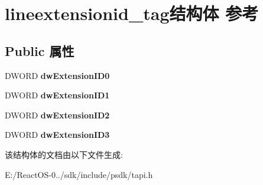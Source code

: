 \hypertarget{structlineextensionid__tag}{}\section{lineextensionid\+\_\+tag结构体 参考}
\label{structlineextensionid__tag}
\subsection*{Public 属性}
\begin{DoxyCompactItemize}
\item 
\mbox{\label{structlineextensionid__tag_a4101965402e7ad22344cae0bae2b930d}} 
D\+W\+O\+RD {\bfseries dw\+Extension\+I\+D0}
\item 
\mbox{\label{structlineextensionid__tag_abeabe2e620da84f50bebbb261ed52724}} 
D\+W\+O\+RD {\bfseries dw\+Extension\+I\+D1}
\item 
\mbox{\label{structlineextensionid__tag_aa7a6bb1ba00a1d0395dea706acea0fd5}} 
D\+W\+O\+RD {\bfseries dw\+Extension\+I\+D2}
\item 
\mbox{\label{structlineextensionid__tag_acc9229f77848ca591dca96f4acca04a0}} 
D\+W\+O\+RD {\bfseries dw\+Extension\+I\+D3}
\end{DoxyCompactItemize}


该结构体的文档由以下文件生成\+:\begin{DoxyCompactItemize}
\item 
E\+:/\+React\+O\+S-\/0../sdk/include/psdk/tapi.\+h\end{DoxyCompactItemize}
